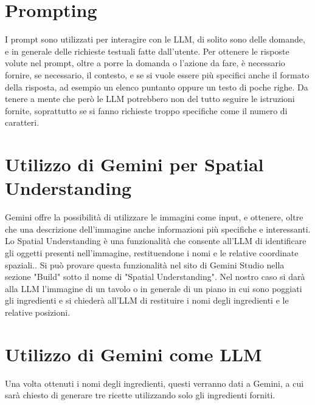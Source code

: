 \section{Prompting}
I prompt sono utilizzati per interagire con le LLM, di solito sono delle domande, e in generale delle richieste testuali fatte dall'utente. Per ottenere le risposte volute nel prompt, oltre a porre la domanda o l'azione da fare, è necessario fornire, se necessario, il contesto, e se si vuole essere più specifici anche il formato della risposta, ad esempio un elenco puntanto oppure un testo di poche righe. Da tenere a mente che però le LLM potrebbero non del tutto seguire le istruzioni fornite, soprattutto se si fanno richieste troppo specifiche come il numero di caratteri. \cite{PromptingNvidia} \cite{PromptingGoogle}

\section{Utilizzo di Gemini per Spatial Understanding}
Gemini offre la possibilità di utilizzare le immagini come input, e ottenere, oltre che una descrizione dell'immagine anche informazioni più specifiche e interessanti. Lo Spatial Understanding è una funzionalità che consente all'LLM di identificare gli oggetti presenti nell'immagine, restituendone i nomi e le relative coordinate spaziali.. Si può provare questa funzionalità nel sito di Gemini Studio nella sezione "Build" sotto il nome di "Spatial Understanding". Nel nostro caso si darà alla LLM l'immagine di un tavolo o in generale di un piano in cui sono poggiati gli ingredienti e si chiederà all'LLM di restituire i nomi degli ingredienti e le relative posizioni.
\section{Utilizzo di Gemini come LLM}
Una volta ottenuti i nomi degli ingredienti, questi verranno dati a Gemini, a cui sarà chiesto di generare tre ricette utilizzando solo gli ingredienti forniti.

